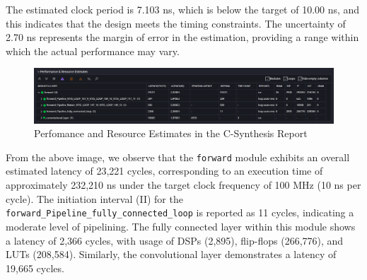 \documentclass{article}
\begin{document}
The estimated clock period is 7.103 ns, which is below the target of 10.00 ns, and this indicates that the design meets the timing constraints. The uncertainty of 2.70 ns represents the margin of error in the estimation, providing a range within which the actual performance may vary.

\begin{figure}[H]
    \centering
    \includegraphics[width=1\textwidth]{./assets/ConvNet/c-synthesis-performanceandresourceestimates.png}
    \caption{Perfomance and Resource Estimates in the C-Synthesis Report}
    \label{fig:convnet-c-synthesis-performance-resources}
\end{figure}

From the above image, we observe that the \texttt{forward} module exhibits an overall estimated latency of 23,221 cycles, corresponding to an execution time of approximately 232,210 ns under the target clock frequency of 100 MHz (10 ns per cycle). The initiation interval (II) for the \texttt{forward\_Pipeline\_fully\_connected\_loop} is reported as 11 cycles, indicating a moderate level of pipelining. The fully connected layer within this module shows a latency of 2,366 cycles, with usage of DSPs (2,895), flip-flops (266,776), and LUTs (208,584). Similarly, the convolutional layer demonstrates a latency of 19,665 cycles.
\end{document}
